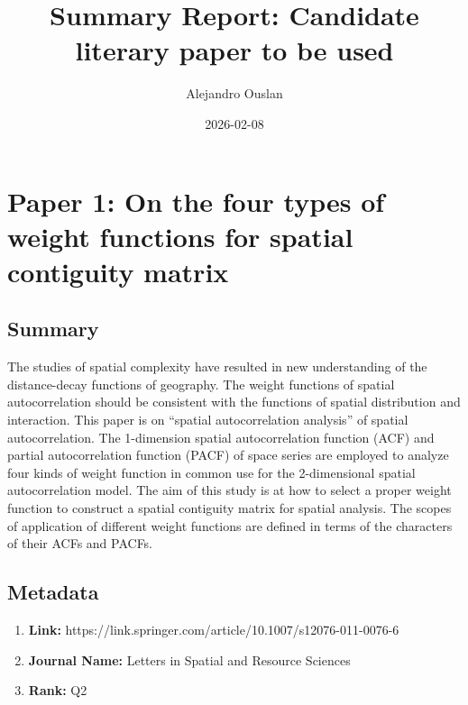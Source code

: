 \documentclass[10pt, oneside]{article}
\title{Summary Report: Candidate literary paper to be used}
\author{Alejandro Ouslan}
\date{2026-02-08}
\begin{document}
\maketitle
\tableofcontents

\vspace{.25in}

\section*{Paper 1: On the four types of weight functions for spatial contiguity matrix}

\subsection*{Summary}
The studies of spatial complexity have resulted in new understanding of the distance-decay functions of geography.
The weight functions of spatial autocorrelation should be consistent with the functions of spatial distribution and
interaction. This paper is on “spatial autocorrelation analysis” of spatial autocorrelation. The 1-dimension spatial
autocorrelation function (ACF) and partial autocorrelation function (PACF) of space series are employed to analyze four
kinds of weight function in common use for the 2-dimensional spatial autocorrelation model. The aim of this study is
at how to select a proper weight function to construct a spatial contiguity matrix for spatial analysis. The scopes
of application of different weight functions are defined in terms of the characters of their ACFs and PACFs. \cite{chen2012four}

\subsection*{Metadata}
\begin{enumerate}
	\item \textbf{Link:} https://link.springer.com/article/10.1007/s12076-011-0076-6
	\item \textbf{Journal Name:} Letters in Spatial and Resource Sciences
	\item \textbf{Rank:} Q2
\end{enumerate}
\end{document}
